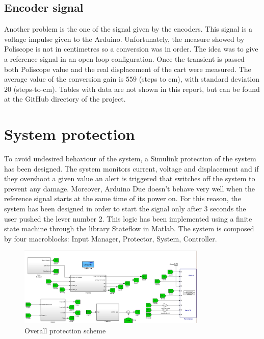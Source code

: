\subsection{Encoder signal}
Another problem is the one of the signal given by the encoders. This signal is a voltage impulse given to the Arduino. Unfortunately, the measure showed by Poliscope is not in centimetres so a conversion was in order. The idea was to give a reference signal in an open loop configuration. Once the transient is passed both Poliscope value and the real displacement of the cart were measured. The average value  of the conversion gain is $559$ (steps to cm), with standard deviation $20$ (steps-to-cm). Tables with data are not shown in this report, but can be found at the GitHub directory of the project.
\section{System protection}
To avoid undesired behaviour of the system, a Simulink protection of the system has been designed. The system monitors current, voltage and displacement and if they overshoot a given value an alert is triggered that switches off the system to prevent any damage. 
Moreover, Arduino Due doesn’t behave very well when the reference signal starts at the same time of its power on. For this reason, the system has been designed in order to start the signal only after 3 seconds the user pushed the lever number 2. This logic has been implemented using a finite state machine through the library Stateflow in Matlab.
The system is composed by four macroblocks: Input Manager, Protector, System, Controller.
\begin{figure}[h]
	\centering
	\includegraphics[width=0.8\textwidth]{img/overall_condom.jpg}
	\caption{Overall protection scheme}
\end{figure}

